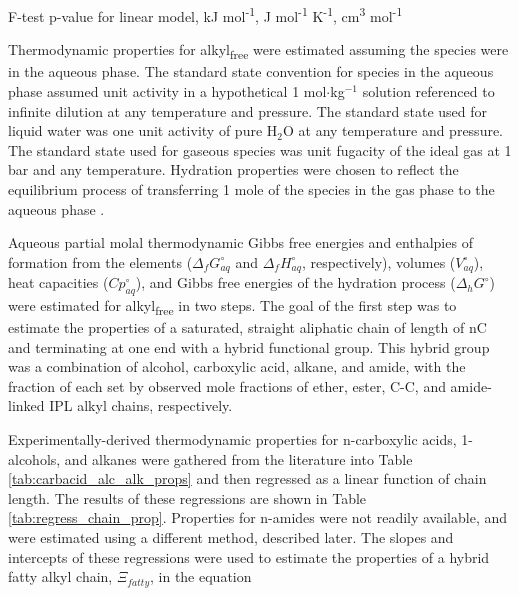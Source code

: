 {\begin{table}
\begin{threeparttable}
\begin{tablenotes}
     F-test p-value for linear model,
     kJ mol\textsuperscript{-1},
     J mol\textsuperscript{-1} K\textsuperscript{-1},
     cm\textsuperscript{3} mol\textsuperscript{-1}
    
        
  \end{tablenotes}
  
  \label{tab:regress_chain_prop}
  \end{threeparttable}
\end{table}
\setcounter{tabcounter}{0} %
\doublespace
\clearpage
}



Thermodynamic properties for alkyl\textsubscript{free} were estimated assuming the species were in the aqueous phase. The standard state convention for species in the aqueous phase assumed unit activity in a hypothetical 1 mol$\cdot$kg$^{-1}$ solution referenced to infinite dilution at any temperature and pressure. The standard state used for liquid water was one unit activity of pure H$_{2}$O at any temperature and pressure. The standard state used for gaseous species was unit fugacity of the ideal gas at 1 bar and any temperature. Hydration properties were chosen to reflect the equilibrium process of transferring 1 mole of the species in the gas phase to the aqueous phase \citep{plyasunov2000thermodynamic}.

Aqueous partial molal thermodynamic Gibbs free energies and enthalpies of formation from the elements ($\Delta_{f}G_{aq}^{\circ}$ and $\Delta_{f}H_{aq}^{\circ}$, respectively), volumes ($V_{aq}^{\circ}$), heat capacities ($Cp_{aq}^{\circ}$), and Gibbs free energies of the hydration process ($\Delta_{h}G^{\circ}$) were estimated for alkyl\textsubscript{free} in two steps. The goal of the first step was to estimate the properties of a saturated, straight aliphatic chain of length of nC and terminating at one end with a hybrid functional group. This hybrid group was a combination of alcohol, carboxylic acid, alkane, and amide, with the fraction of each set by observed mole fractions of ether, ester, C-C, and amide-linked IPL alkyl chains, respectively. 

Experimentally-derived thermodynamic properties for n-carboxylic acids, 1-alcohols, and alkanes were gathered from the literature into Table \ref{tab:carbacid_alc_alk_props} and then regressed as a linear function of chain length. The results of these regressions are shown in Table \ref{tab:regress_chain_prop}. Properties for n-amides were not readily available, and were estimated using a different method, described later.
The slopes and intercepts of these regressions were used to estimate the properties of a hybrid fatty alkyl chain, $\Xi_{fatty}$, in the equation

